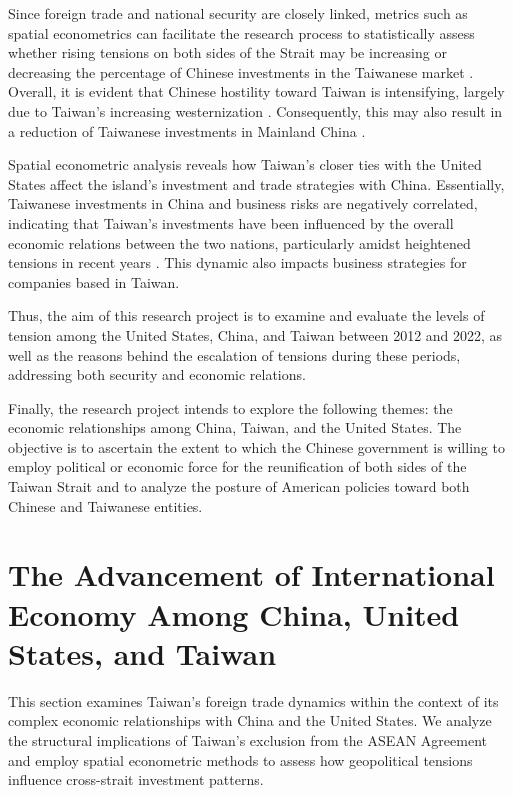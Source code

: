 \documentclass{article}
\begin{document}
Since foreign trade and national security are closely linked, metrics such as spatial econometrics can facilitate the research process to statistically assess whether rising tensions on both sides of the Strait may be increasing or decreasing the percentage of Chinese investments in the Taiwanese market \citep{pietrafesa_political_economic_relations_china_taiwan_usa}. Overall, it is evident that Chinese hostility toward Taiwan is intensifying, largely due to Taiwan's increasing westernization \citep{tian_china_drops_peaceful_in_push_for_taiwan_reunification}. Consequently, this may also result in a reduction of Taiwanese investments in Mainland China \citep{yeung_what_you_need_to_know_china_taiwan_tensions}.

Spatial econometric analysis reveals how Taiwan's closer ties with the United States affect the island's investment and trade strategies with China. Essentially, Taiwanese investments in China and business risks are negatively correlated, indicating that Taiwan's investments have been influenced by the overall economic relations between the two nations, particularly amidst heightened tensions in recent years \citep{gomes_international_trade_per_capita_gdp}. This dynamic also impacts business strategies for companies based in Taiwan.

Thus, the aim of this research project is to examine and evaluate the levels of tension among the United States, China, and Taiwan between 2012 and 2022, as well as the reasons behind the escalation of tensions during these periods, addressing both security and economic relations.

Finally, the research project intends to explore the following themes: the economic relationships among China, Taiwan, and the United States. The objective is to ascertain the extent to which the Chinese government is willing to employ political or economic force for the reunification of both sides of the Taiwan Strait and to analyze the posture of American policies toward both Chinese and Taiwanese entities.

\section{The Advancement of International Economy Among China, United States, and Taiwan}

This section examines Taiwan's foreign trade dynamics within the context of its complex economic relationships with China and the United States. We analyze the structural implications of Taiwan's exclusion from the ASEAN Agreement and employ spatial econometric methods to assess how geopolitical tensions influence cross-strait investment patterns.
\end{document}
